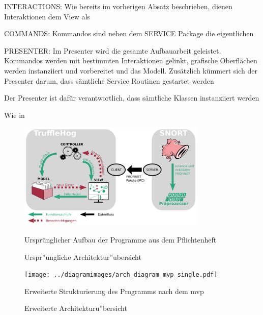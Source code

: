 INTERACTIONS:
Wie bereits im vorherigen Absatz beschrieben, dienen Interaktionen dem View als 

COMMANDS:
Kommandos sind neben dem SERVICE Package die eigentlichen 

PRESENTER:
Im Presenter wird die gesamte Aufbauarbeit geleistet. Kommandos werden mit bestimmten Interaktionen gelinkt, grafische Oberflächen werden instanziiert und vorbereitet und das Modell.
Zusätzlich kümmert sich der Presenter darum, dass sämtliche Service Routinen gestartet werden 


Der Presenter ist dafür verantwortlich, dass sämtliche Klassen instanziiert werden 

Wie  in 


\begin{figure}[H]
  \centering
  \includegraphics[width=0.8\textwidth]{../diagramimages/praesentationsmodel.png}
  \caption[Urspr''ungliche Architektur''ubersicht]{Urspr''ungliche Architektur''ubersicht}
  \medskip
  Ursprünglicher Aufbau der Programme aus dem Pflichtenheft
\end{figure} 

\begin{figure}[H]
  \centering
  \texttt{[image: ../diagramimages/arch\_diagram\_mvp\_single.pdf]}
  \caption[Erweiterte Architekturu''bersicht]{Erweiterte Architekturu''bersicht}
  \medskip
  Erweiterte Strukturierung des Programms nach dem \gls{mvp}
\end{figure} 